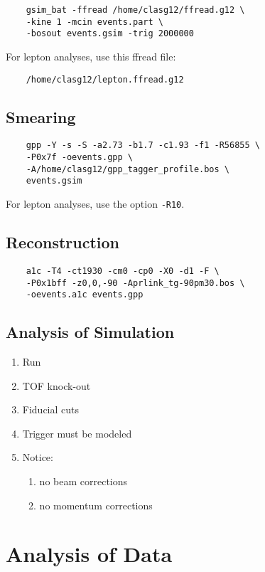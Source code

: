 \documentclass[10pt,twocolumn,oneside,letterpaper]{article}
\begin{document}
\begin{verbatim}
    gsim_bat -ffread /home/clasg12/ffread.g12 \
    -kine 1 -mcin events.part \
    -bosout events.gsim -trig 2000000
\end{verbatim}
For lepton analyses, use this ffread file:
\begin{verbatim}
    /home/clasg12/lepton.ffread.g12
\end{verbatim}

\subsection{Smearing}

\begin{verbatim}
    gpp -Y -s -S -a2.73 -b1.7 -c1.93 -f1 -R56855 \
    -P0x7f -oevents.gpp \
    -A/home/clasg12/gpp_tagger_profile.bos \
    events.gsim
\end{verbatim}
For lepton analyses, use the option \verb|-R10|.

\subsection{Reconstruction}

\begin{verbatim}
    a1c -T4 -ct1930 -cm0 -cp0 -X0 -d1 -F \
    -P0x1bff -z0,0,-90 -Aprlink_tg-90pm30.bos \
    -oevents.a1c events.gpp
\end{verbatim}

\subsection{Analysis of Simulation}

\begin{enumerate}
    \item Run \prog{eloss}
    \item TOF knock-out
    \item Fiducial cuts
    \item Trigger must be modeled
    \item Notice:
    \begin{enumerate}
        \item no beam corrections
        \item no momentum corrections
    \end{enumerate}
\end{enumerate}

\section{Analysis of Data}
\end{document}
